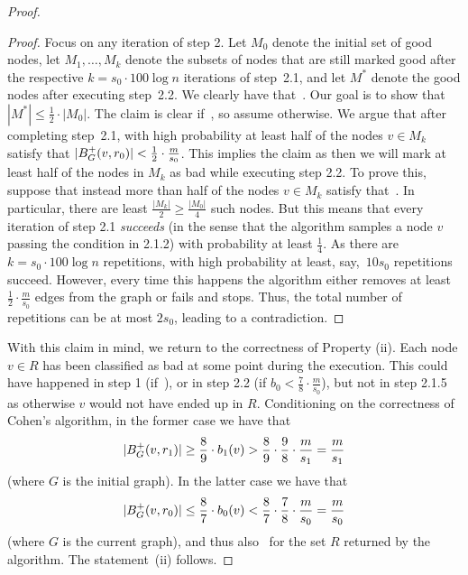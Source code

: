 \documentclass[letterpaper,11pt]{article}
\begin{document}
\begin{proof}
\begin{proof}
Focus on any iteration of step 2. Let $M_0$ denote the initial set of good nodes, let $M_1, \dots, M_k$ denote the subsets of nodes that are still marked good after the respective $k = s_0 \cdot 100 \log n$ iterations of step~2.1, and let $M^*$ denote the good nodes after executing step~2.2. We clearly have that~. Our goal is to show that $|M^*| \leq \frac12 \cdot |M_0|$. The claim is clear if~, so assume otherwise. We argue that after completing step~2.1, with high probability at least half of the nodes $v \in M_k$ satisfy that $|B^+_G(v, r_0)| < \tfrac12 \cdot \tfrac{m}{s_0}$. This implies the claim as then we will mark at least half of the nodes in $M_k$ as bad while executing step 2.2. To prove this, suppose that instead more than half of the nodes $v \in M_k$ satisfy that~. In particular, there are least $\frac{|M_k|}{2} \geq \frac{|M_0|}{4}$ such nodes. But this means that every iteration of step 2.1 \emph{succeeds} (in the sense that the algorithm samples a node $v$ passing the condition in 2.1.2) with probability at least $\frac14$. As there are $k = s_0 \cdot 100 \log n$ repetitions, with high probability at least, say,~$10 s_0$ repetitions succeed. However, every time this happens the algorithm either removes at least $\frac12 \cdot \frac{m}{s_0}$ edges from the graph or fails and stops. Thus, the total number of repetitions can be at most $2 s_0$, leading to a contradiction.
\end{proof}

With this claim in mind, we return to the correctness of Property (ii). Each node $v \in R$ has been classified as bad at some point during the execution. This could have happened in step 1 (if~), or in step 2.2 (if $b_0 < \frac78 \cdot \frac{m}{s_0}$), but not in step 2.1.5 as otherwise $v$ would not have ended up in $R$. Conditioning on the correctness of Cohen's algorithm, in the former case we have that
\begin{equation*}
    |B^+_G(v, r_1)| \geq \frac89 \cdot b_1(v) > \frac89 \cdot \frac98 \cdot \frac{m}{s_1} = \frac{m}{s_1} 
\end{equation*}
(where $G$ is the initial graph). In the latter case we have that
\begin{equation*}
    |B^+_G(v, r_0)| \leq \frac87 \cdot b_0(v) < \frac87 \cdot \frac78 \cdot \frac{m}{s_0} = \frac{m}{s_0}
\end{equation*}
(where $G$ is the current graph), and thus also~ for the set $R$ returned by the algorithm. The statement~(ii) follows.


\end{proof}
\end{document}
